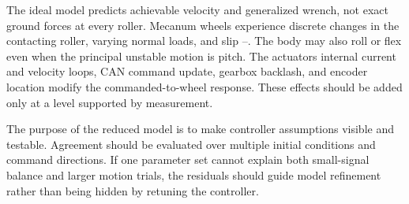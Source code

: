 The ideal model predicts achievable velocity and generalized wrench, not
exact ground forces at every roller. Mecanum wheels experience discrete
changes in the contacting roller, varying normal loads, and slip
\cite{bayar2020contact}--\cite{barcenas2025robust}. The body may also roll or flex even when the
principal unstable motion is pitch. The actuator\textquotesingle s
internal current and velocity loops, CAN command update, gearbox
backlash, and encoder location modify the commanded-to-wheel response.
These effects should be added only at a level supported by measurement.

The purpose of the reduced model is to make controller assumptions
visible and testable. Agreement should be evaluated over multiple
initial conditions and command directions. If one parameter set cannot
explain both small-signal balance and larger motion trials, the
residuals should guide model refinement rather than being hidden by
retuning the controller.

